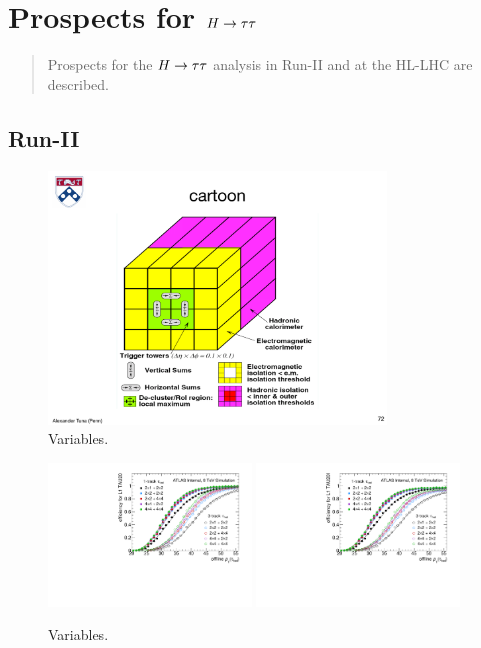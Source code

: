 \chapter[prospects][prospects]{Prospects for $H\rightarrow\tau\tau$}
\label{chap:prospects}

\begin{quote}
Prospects for the $H\rightarrow\tau\tau$ analysis in Run-II and at the HL-LHC are described.
\end{quote}

\section{Run-II}
\label{sec:prospects-run2}

\begin{figure}[tp]
  \centering
  \includegraphics[width=0.80\textwidth]{figures/trigger/cartoonL1}
  \caption{Variables.}
  \label{fig:prospects-trigger-cartoonL1}
\end{figure}

\begin{figure}[tp]
  \centering
  \includegraphics[width=0.48\textwidth]{figures/trigger/turnon_L1TAU20_1p3p.pdf}
  \includegraphics[width=0.48\textwidth]{figures/trigger/turnon_L1TAU20I_1p3p.pdf}
  \caption{Variables.}
  \label{fig:prospects-trigger-towersize}
\end{figure}

